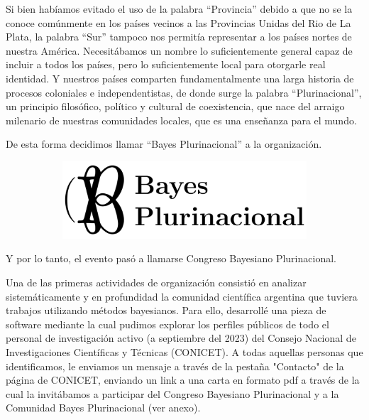 \documentclass[a4paper,11pt]{book}
\theoremstyle{definition}
\begin{document}

Si bien habíamos evitado el uso de la palabra ``Provincia'' debido a que no se la conoce comúnmente en los países vecinos a las Provincias Unidas del Rio de La Plata, la palabra ``Sur'' tampoco nos permitía representar a los países nortes de nuestra América.
%
Necesitábamos un nombre lo suficientemente general capaz de incluir a todos los países, pero lo suficientemente local para otorgarle real identidad.
%
Y nuestros países comparten fundamentalmente una larga historia de procesos coloniales e independentistas, de donde surge la palabra ``Plurinacional'', un principio filosófico, político y cultural de coexistencia, que nace del arraigo milenario de nuestras comunidades locales, que es una enseñanza para el mundo.


De esta forma decidimos llamar ``Bayes Plurinacional'' a la organización.
%
\begin{figure}[ht!]
\centering
  \begin{subfigure}[b]{0.55\textwidth}
  \includegraphics[page=1,width=\textwidth]{static/BP.pdf}
  \end{subfigure}
\end{figure}
%
Y por lo tanto, el evento pasó a llamarse Congreso Bayesiano Plurinacional.


Una de las primeras actividades de organización consistió en analizar sistemáticamente y en profundidad la comunidad científica argentina que tuviera trabajos utilizando métodos bayesianos.
%
Para ello, desarrollé una pieza de software mediante la cual pudimos explorar los perfiles públicos de todo el personal de investigación activo (a septiembre del 2023) del Consejo Nacional de Investigaciones Científicas y Técnicas (CONICET).
%
A todas aquellas personas que identificamos, le enviamos un mensaje a través de la pestaña "Contacto" de la página de CONICET, enviando un link a una carta en formato pdf a través de la cual la invitábamos a participar del Congreso Bayesiano Plurinacional y a la Comunidad Bayes Plurinacional (ver anexo).
\end{document}
